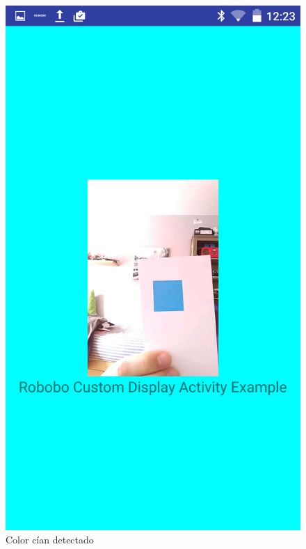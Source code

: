 \begin{figure}
\begin{minipage}{0.45\textwidth}
\end{minipage}\hfill
\begin{minipage}{0.45\textwidth}
\centering
\includegraphics[width=1\linewidth]{imagenes/color_detection_cyan.png}

\caption{Color cían detectado}
\label{fig:cyan_color}

\end{minipage}
\end{figure}

